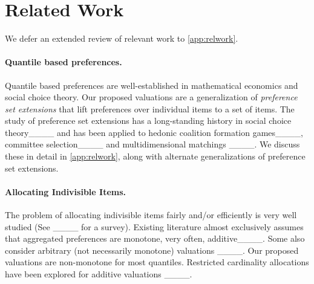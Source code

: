 \section{Related Work}
We defer an extended review of relevant work to \cref{app:relwork}. %



 \paragraph{Quantile based preferences. } Quantile based preferences are well-established in mathematical economics and social choice theory. %
 Our proposed  valuations are a generalization of \textit{preference set extensions} that lift preferences over individual items to a set of items. The study of preference set extensions has a long-standing history in social choice theory____ and has been applied to hedonic coalition formation games____, committee selection____ and multidimensional matchings ____. %
 We discuss these in detail in \cref{app:relwork}, along with alternate generalizations of preference set extensions. %

 

\paragraph{Allocating Indivisible Items.} The problem of allocating indivisible items fairly and/or efficiently is very well studied (See ____ for a survey). Existing literature almost exclusively assumes that aggregated preferences are monotone, very often, additive____. Some also consider arbitrary (not necessarily monotone) valuations ____. Our proposed valuations are non-monotone for most quantiles.  
%
Restricted cardinality allocations have been explored for additive valuations ____. %

